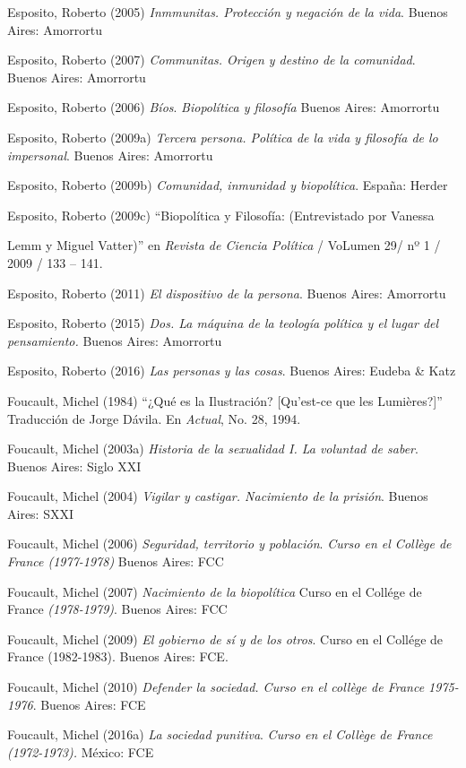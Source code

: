 \documentclass[a4paper,]{scrartcl}
\begin{document}
Esposito, Roberto (2005) \emph{Inmmunitas. Protección y negación de la
vida}. Buenos Aires: Amorrortu

Esposito, Roberto (2007) \emph{Communitas. Origen y destino de la
comunidad}. Buenos Aires: Amorrortu

Esposito, Roberto (2006) \emph{Bíos}. \emph{Biopolítica y filosofía}
Buenos Aires: Amorrortu

Esposito, Roberto (2009a) \emph{Tercera persona. Política de la vida y
filosofía de lo impersonal}. Buenos Aires: Amorrortu

Esposito, Roberto (2009b) \emph{Comunidad, inmunidad y biopolítica}.
España: Herder

Esposito, Roberto (2009c) ``Biopolítica y Filosofía: (Entrevistado por
Vanessa

Lemm y Miguel Vatter)'' en \emph{Revista de Ciencia Política} / VoLumen
29/ nº 1 / 2009 / 133 -- 141.

Esposito, Roberto (2011) \emph{El dispositivo de la persona}. Buenos
Aires: Amorrortu

Esposito, Roberto (2015) \emph{Dos. La máquina de la teología política y
el lugar del pensamiento.} Buenos Aires: Amorrortu

Esposito, Roberto (2016) \emph{Las personas y las cosas}. Buenos Aires:
Eudeba \& Katz

Foucault, Michel (1984) ``¿Qué es la Ilustración? {[}Qu'est-ce que les
Lumières?{]}'' Traducción de Jorge Dávila. En \emph{Actual}, No. 28,
1994.

Foucault, Michel (2003a) \emph{Historia de la sexualidad I. La voluntad
de saber}. Buenos Aires: Siglo XXI

Foucault, Michel (2004) \emph{Vigilar y castigar. Nacimiento de la
prisión}. Buenos Aires: SXXI

Foucault, Michel (2006) \emph{Seguridad, territorio y población}.
\emph{Curso en el Collège de France (1977-1978)} Buenos Aires: FCC

Foucault, Michel (2007) \emph{Nacimiento de la biopolítica} Curso en el
Collége de France \emph{(1978-1979)}. Buenos Aires: FCC

Foucault, Michel (2009) \emph{El gobierno de sí y de los otros}. Curso
en el Collége de France (1982-1983). Buenos Aires: FCE.

Foucault, Michel (2010) \emph{Defender la sociedad. Curso en el collège
de France 1975-1976}. Buenos Aires: FCE

Foucault, Michel (2016a) \emph{La sociedad punitiva}. \emph{Curso en el
Collège de France (1972-1973).} México: FCE
\end{document}
